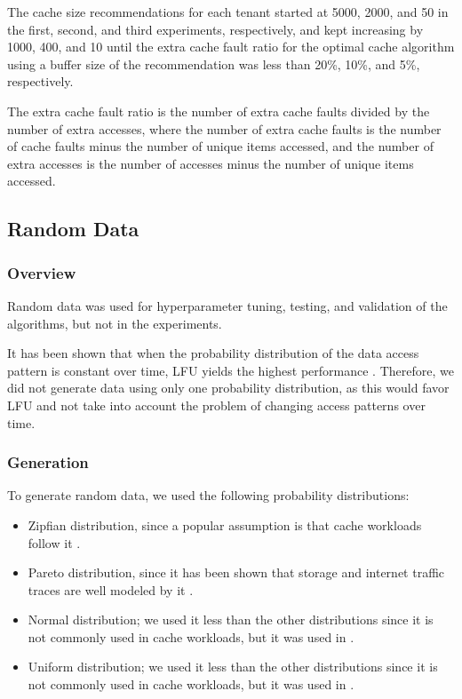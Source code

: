 
The cache size recommendations for each tenant started at 5000, 2000, and 50 in the first, 
second, and third experiments, respectively, and kept increasing by 1000, 400, and 10 until 
the extra cache fault ratio for the optimal cache algorithm using a buffer size of the 
recommendation was less than 20\%, 10\%, and 5\%, respectively.

The extra cache fault ratio is the number of extra cache faults divided by the number of extra 
accesses, where the number of extra cache faults is the number of cache faults minus the number 
of unique items accessed, and the number of extra accesses is the number of accesses minus the 
number of unique items accessed.

\subsection{Random Data}

\subsubsection{Overview}

Random data was used for hyperparameter tuning, testing, and validation of the algorithms, 
but not in the experiments.

It has been shown that when the probability distribution of the data access pattern is constant 
over time, LFU yields the highest performance \cite{lfu-highest-perf-zipf} 
\cite{lfu-highest-perf-inproc} \cite{tiny-lfu}. Therefore, we did not generate data using only 
one probability distribution, as this would favor LFU and not take into account the problem of 
changing access patterns over time.

\subsubsection{Generation}

To generate random data, we used the following probability distributions:

\begin{itemize}
    \item Zipfian distribution, since a popular assumption is that cache workloads follow it 
    \cite{zipf-dist-cache-1} \cite{zipf-dist-cache-2} \cite{zipf-dist-cache-3} 
    \cite{lfu-highest-perf-zipf}.
    \item Pareto distribution, since it has been shown that storage and internet traffic traces 
    are well modeled by it \cite{pareto-dist-workload} \cite{pareto-dist-workload-2} 
    \cite{pareto-dist-workload-3}.
    \item Normal distribution; we used it less than the other distributions since it is not 
    commonly used in cache workloads, but it was used in \cite{memory-aware-buffer-pool-manager}.
    \item Uniform distribution; we used it less than the other distributions since it is not 
    commonly used in cache workloads, but it was used in \cite{memory-aware-buffer-pool-manager}.
\end{itemize}

